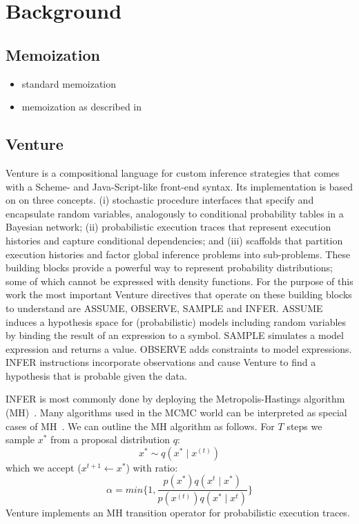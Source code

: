 \documentclass{article} %
\begin{document}
\section{Background}
\subsection{Memoization}
\begin{itemize}
 \item standard memoization
 \item memoization as described in~\citep{goodman2008church}
\end{itemize}

\subsection{Venture}
Venture is a compositional language for custom inference strategies that comes with a Scheme- and Java-Script-like front-end syntax. Its implementation is based on on three concepts. (i) stochastic procedure interfaces that specify and encapsulate random variables, analogously to conditional probability tables in a Bayesian network; (ii) probabilistic execution traces that represent execution histories and capture conditional dependencies; and (iii) scaffolds that partition execution histories and factor global inference problems into sub-problems. These building blocks provide a powerful way to represent probability distributions; some of which cannot be expressed with density functions. For the purpose of this work the most important Venture directives that operate on these building blocks to understand are ASSUME, OBSERVE, SAMPLE and INFER. ASSUME induces a hypothesis space for (probabilistic) models including random variables by binding the result of an expression to a symbol. SAMPLE simulates a model expression and returns a value. OBSERVE adds constraints to model expressions. INFER instructions incorporate observations and cause Venture to find a hypothesis that is probable given the data. 

INFER is most commonly done by deploying the Metropolis-Hastings algorithm (MH)~\citep{metropolis1953equation}.  Many algorithms used in the MCMC world can be interpreted as special cases of MH~\citep{andrieu2003introduction}. We can outline the MH algorithm as follows. For $T$ steps we sample $x^*$ from a proposal distribution $q$:
\begin{equation}
 x^* \sim q(x^* \mid x^{(t)})
\end{equation}
which we accept ($x^{t+1} \leftarrow x ^*$) with ratio:
\begin{equation}
\alpha = min \bigg\{1,\frac{p(x^*) q(x^{t}\mid x^*)}{p(x^{(t)}) q(x^* \mid x^{t})} \bigg\}  
\end{equation}
Venture implements an MH transition operator for probabilistic execution traces.
\end{document}
